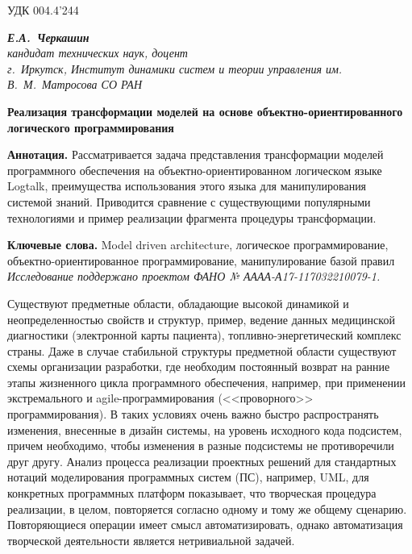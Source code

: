\documentclass[12pt]{article}
\begin{document}
УДК 004.4'244
\begin{flushright}\itshape{}
  \textbf{Е.А.~Черкашин}\\
  кандидат технических наук, доцент\\
  г.~Иркутск, Институт динамики систем и теории управления им. В.~М.~Матросова СО РАН
\end{flushright}
\begin{center}
  \Large\bfseries Реализация трансформации моделей на основе объектно-ориентированного логического программирования
\end{center}

\textbf{Аннотация.} Рассматривается задача представления трансформации моделей программного обеспечения на объектно-ориентированном логическом языке Logtalk, преимущества использования этого языка для манипулирования системой знаний.  Приводится сравнение с существующими популярными технологиями и пример реализации фрагмента процедуры трансформации.

\textbf{Ключевые слова.} Model driven architecture, логическое программирование, объектно-ориентированное программирование, манипулирование базой правил\\

\textit{Исследование поддержано проектом ФАНО № АААА-А17-117032210079-1.}

Существуют предметные области, обладающие высокой динамикой и неопределенностью свойств и структур, пример, ведение данных медицинской диагностики (электронной карты пациента), топливно-энергетический комплекс страны.  Даже в случае стабильной структуры предметной области существуют схемы организации разработки, где необходим постоянный возврат на ранние этапы жизненного цикла программного обеспечения, например, при применении экстремального и agile-программирования (<<проворного>> программирования).  В таких условиях очень важно быстро распространять изменения, внесенные в дизайн системы, на уровень исходного кода подсистем, причем необходимо, чтобы изменения в разные подсистемы не противоречили друг другу.  Анализ процесса реализации проектных решений для стандартных нотаций моделирования программных систем (ПС), например, UML, для конкретных программных платформ показывает, что творческая процедура реализации, в целом, повторяется согласно одному и тому же общему сценарию.  Повторяющиеся операции имеет смысл автоматизировать, однако автоматизация творческой деятельности является нетривиальной задачей.
\end{document}
